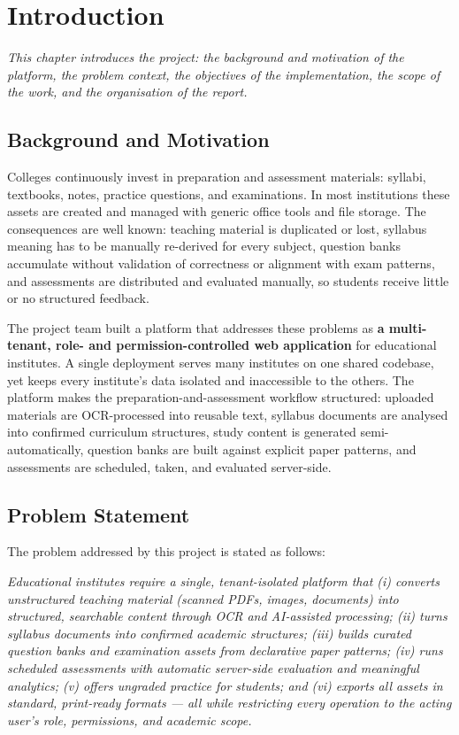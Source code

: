 \chapter{Introduction}
\label{ch:introduction}

\begin{center}
\textit{This chapter introduces the project: the background and motivation
of the platform, the problem context, the objectives of the implementation,
the scope of the work, and the organisation of the report.}
\end{center}

\vspace*{\fill}
\clearpage
\section{Background and Motivation}

Colleges continuously invest in preparation and assessment materials:
syllabi, textbooks, notes, practice questions, and examinations. In most
institutions these assets are created and managed with generic office tools and
file storage. The consequences are well known: teaching material is duplicated
or lost, syllabus meaning has to be manually re-derived for every subject,
question banks accumulate without validation of correctness or alignment with
exam patterns, and assessments are distributed and evaluated manually, so
students receive little or no structured feedback.

The project team built a platform that addresses these problems as \textbf{a
multi-tenant, role- and permission-controlled web application} for educational
institutes. A single deployment serves many institutes on one shared codebase,
yet keeps every institute's data isolated and inaccessible to the others. The
platform makes the preparation-and-assessment workflow structured: uploaded
materials are OCR-processed into reusable text, syllabus documents are analysed
into confirmed curriculum structures, study content is generated
semi-automatically, question banks are built against explicit paper patterns,
and assessments are scheduled, taken, and evaluated server-side.

\section{Problem Statement}

\noindent The problem addressed by this project is stated as follows:

\emph{Educational institutes require a single, tenant-isolated platform that (i)
converts unstructured teaching material (scanned PDFs, images, documents) into
structured, searchable content through OCR and AI-assisted processing; (ii)
turns syllabus documents into confirmed academic structures; (iii) builds
curated question banks and examination assets from declarative paper patterns;
(iv) runs scheduled assessments with automatic server-side evaluation and
meaningful analytics; (v) offers ungraded practice for students; and (vi)
exports all assets in standard, print-ready formats --- all while restricting
every operation to the acting user's role, permissions, and academic scope.}

